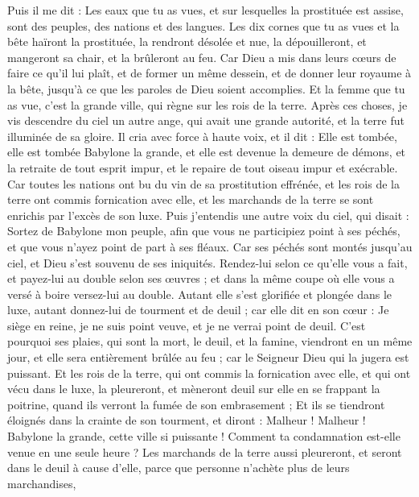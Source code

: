 \begin{multicols}{2}
Puis il me dit : Les eaux que tu as vues, et sur lesquelles la prostituée est assise, sont des peuples, des nations et des langues.
Les dix cornes que tu as vues et la bête haïront la prostituée, la rendront désolée et nue, la dépouilleront, et mangeront sa chair, et la brûleront au feu.
Car Dieu a mis dans leurs cœurs de faire ce qu'il lui plaît, et de former un même dessein, et de donner leur royaume à la bête, jusqu'à ce que les paroles de Dieu soient accomplies.
Et la femme que tu as vue, c'est la grande ville, qui règne sur les rois de la terre.
\VerseOne{}Après ces choses, je vis descendre du ciel un autre ange, qui avait une grande autorité, et la terre fut illuminée de sa gloire.
Il cria avec force à haute voix, et il dit : Elle est tombée, elle est tombée Babylone la grande, et elle est devenue la demeure de démons, et la retraite de tout esprit impur, et le repaire de tout oiseau impur et exécrable.
Car toutes les nations ont bu du vin de sa prostitution effrénée, et les rois de la terre ont commis fornication avec elle, et les marchands de la terre se sont enrichis par l'excès de son luxe.
Puis j'entendis une autre voix du ciel, qui disait : Sortez de Babylone mon peuple, afin que vous ne participiez point à ses péchés, et que vous n'ayez point de part à ses fléaux.
Car ses péchés sont montés jusqu'au ciel, et Dieu s'est souvenu de ses iniquités.
Rendez-lui selon ce qu'elle vous a fait, et payez-lui au double selon ses œuvres ; et dans la même coupe où elle vous a versé à boire versez-lui au double.
Autant elle s'est glorifiée et plongée dans le luxe, autant donnez-lui de tourment et de deuil ; car elle dit en son cœur : Je siège en reine, je ne suis point veuve, et je ne verrai point de deuil.
C'est pourquoi ses plaies, qui sont la mort, le deuil, et la famine, viendront en un même jour, et elle sera entièrement brûlée au feu ; car le Seigneur Dieu qui la jugera est puissant.
Et les rois de la terre, qui ont commis la fornication avec elle, et qui ont vécu dans le luxe, la pleureront, et mèneront deuil sur elle en se frappant la poitrine, quand ils verront la fumée de son embrasement ;
Et ils se tiendront éloignés dans la crainte de son tourment, et diront : Malheur ! Malheur ! Babylone la grande, cette ville si puissante ! Comment ta condamnation est-elle venue en une seule heure ?
Les marchands de la terre aussi pleureront, et seront dans le deuil à cause d'elle, parce que personne n'achète plus de leurs marchandises,

\end{multicols}
